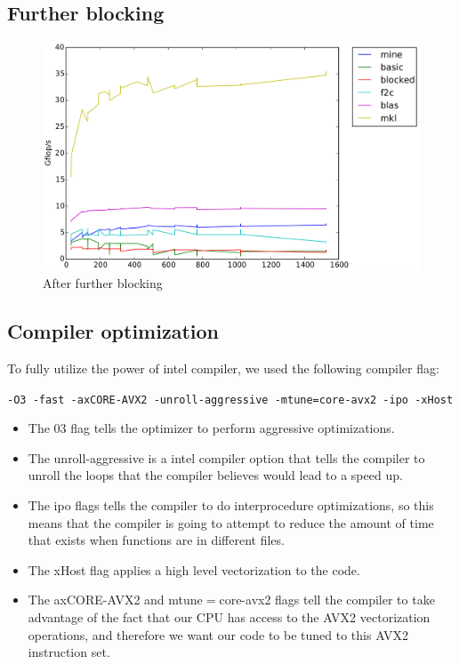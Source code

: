 \documentclass[11pt]{article}
\begin{document}
   		
   		
		\subsection{Further blocking}
		
		\begin{figure}[H]
			\centering
			\includegraphics[width=5in]{timing_vector_32_64_cp_align.png}
			\caption{After further blocking}
		\end{figure}
		
		\clearpage
			    		
		
		    
		\subsection{Compiler optimization}
		
		\vspace{0.5cm}
		
		To fully utilize the power of intel compiler, we used the following compiler flag:
		\begin{center}
		\texttt{-O3 -fast -axCORE-AVX2 -unroll-aggressive -mtune=core-avx2 -ipo -xHost}	
		\end{center}
		
		\begin{itemize}
			\item The 03 flag tells the optimizer to perform aggressive optimizations.
			\item The unroll-aggressive is a intel compiler option that tells the compiler to unroll the loops that the compiler believes would lead to a speed up. 
			\item The ipo flags tells the compiler to do interprocedure optimizations, so this means that the compiler is going to attempt to reduce the amount of time that exists when functions are in different files.
			\item The xHost flag applies a high level vectorization to the code.
			\item The axCORE-AVX2  and mtune$=$core-avx2 flags tell the compiler to take advantage of the fact that our CPU has access to the AVX2 vectorization operations, and therefore we want our code to be tuned to this AVX2 instruction set. 
		\end{itemize}
		
\end{document}
